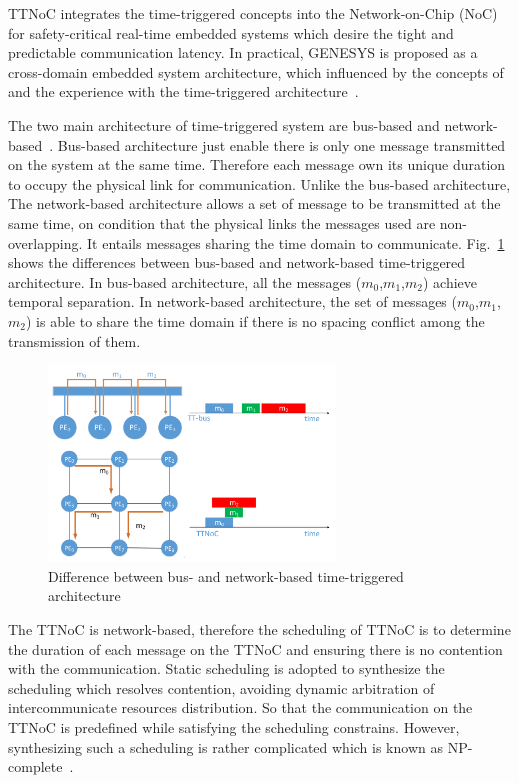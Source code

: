 \documentclass[jornal]{IEEEtran}
\begin{document}
TTNoC integrates the time-triggered concepts into the Network-on-Chip (NoC) for safety-critical real-time embedded systems which desire the tight and predictable communication latency.
In practical, GENESYS is proposed as a cross-domain embedded system architecture, which influenced by the concepts of and the experience with the time-triggered architecture~\cite{DBLP:conf/ladc/Kopetz11}.

The two main architecture of time-triggered system are bus-based and network-based~\cite{DBLP:conf/date/HuangBRBK12}.
Bus-based architecture just enable there is only one message transmitted on the system at the same time. 
Therefore each message own its unique duration to occupy the physical link for communication.
Unlike the bus-based architecture, The network-based architecture allows a set of message to be transmitted at the same time, on condition that the physical links the messages used are non-overlapping.
It entails messages sharing the time domain to communicate. Fig.~\ref{f:diff} shows the differences between bus-based and network-based time-triggered architecture.
In bus-based architecture, all the messages ($m_0$,$m_1$,$m_2$) achieve temporal separation. 
In network-based architecture, the set of messages ($m_0$,$m_1$,$m_2$) is able to share the time domain if there is no spacing conflict among the transmission of them.
\begin{figure}[!t]
	\centering
	\includegraphics[width=3in]{picture/difference.pdf}
	\caption{Difference between bus- and network-based time-triggered architecture}
	\label{f:diff}
\end{figure}

The TTNoC is network-based, therefore the scheduling of TTNoC is to determine the duration of each message on the TTNoC and ensuring there is no contention with the communication. 
Static scheduling is adopted to synthesize the scheduling which resolves contention, avoiding dynamic arbitration of intercommunicate resources distribution. 
So that the communication on the TTNoC is predefined while satisfying the scheduling constrains.
However, synthesizing such a scheduling is rather complicated which is known as NP-complete~\cite{DBLP:conf/date/HuangBRBK12,DBLP:conf/rtss/Steiner10}.
\end{document}

